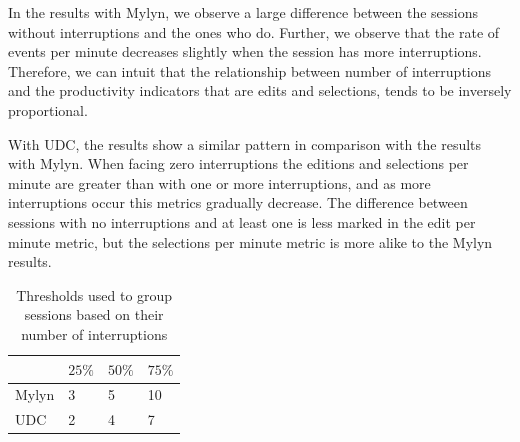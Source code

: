 \documentclass[times]{smrauth}
\begin{document}
In the results with Mylyn, we observe a large difference between the sessions without interruptions and the ones who do. Further, we observe that the rate of events per minute decreases slightly when the session has more interruptions. Therefore, we can intuit that the relationship between number of interruptions and the productivity indicators that are edits and selections, tends to be inversely proportional. 

With UDC, the results show a similar pattern in comparison with the results with Mylyn. When facing zero interruptions the editions and selections per minute are greater than with one or more interruptions, and as more interruptions occur this metrics gradually decrease. The difference between sessions with no interruptions and at least one is less marked in the edit per minute metric, but the selections per minute metric is more alike to the Mylyn results.


\begin{table}[ht!]
\small
\renewcommand{\arraystretch}{1.3}
\caption{Thresholds used to group sessions based on their number of interruptions} %
\label{tbl:quartil_int}
\centering
\begin{tabular}{l | p{0.6cm} | p{0.6cm} | p{0.6cm}} 
     & $25\%$ & $50\%$ & $75\%$ \\  
  \hline 
  Mylyn &  3 & 5 & 10  \\ 
  \hline  
  UDC &  2 & 4 & 7  \\  
\end{tabular}
\end{table}
\end{document}
